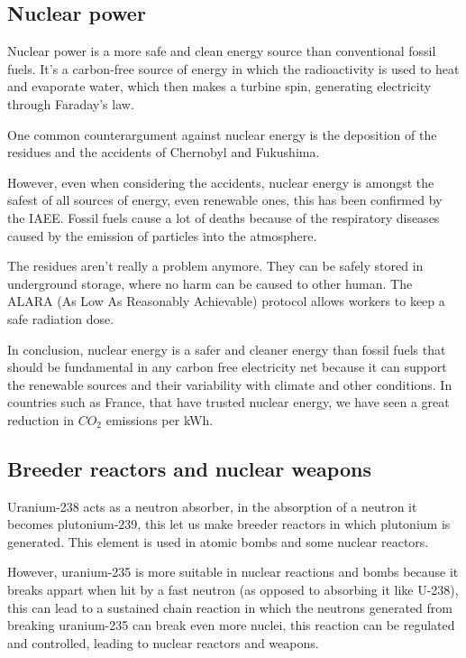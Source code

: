 \documentclass{article} %
\begin{document}
\subsection{Nuclear power}

Nuclear power is a more safe and clean energy source than conventional fossil fuels. It's a carbon-free source of energy in which the radioactivity is used to heat and evaporate water, which then makes a turbine spin, generating electricity through Faraday's law.

One common counterargument against nuclear energy is the deposition of the residues and the accidents of Chernobyl and Fukushima.

However, even when considering the accidents, nuclear energy is amongst the safest of all sources of energy, even renewable ones, this has been confirmed by the IAEE. Fossil fuels cause a lot of deaths because of the respiratory diseases caused by the emission of particles into the atmosphere.

The residues aren't really a problem anymore. They can be safely stored in underground storage, where no harm can be caused to other human. The ALARA (As Low As Reasonably Achievable) protocol allows workers to keep a safe radiation dose.

In conclusion, nuclear energy is a safer and cleaner energy than fossil fuels that should be fundamental in any carbon free electricity net because it can support the renewable sources and their variability with climate and other conditions. In countries such as France, that have trusted nuclear energy, we have seen a great reduction in $CO_2$ emissions per kWh.

\subsection{Breeder reactors and nuclear weapons}

Uranium-238 acts as a neutron absorber, in the absorption of a neutron it becomes plutonium-239, this let us make breeder reactors in which plutonium is generated. This element is used in atomic bombs and some nuclear reactors.

However, uranium-235 is more suitable in nuclear reactions and bombs because it breaks appart when hit by a fast neutron (as opposed to absorbing it like U-238), this can lead to a sustained chain reaction in which the neutrons generated from breaking uranium-235 can break even more nuclei, this reaction can be regulated and controlled, leading to nuclear reactors and weapons.
\end{document}
